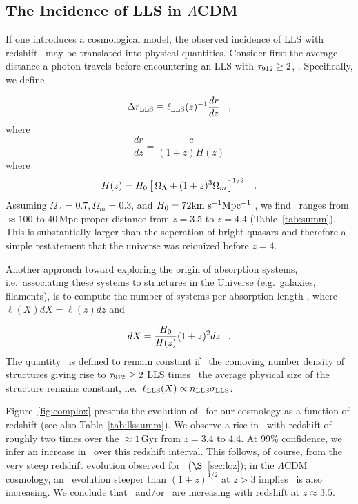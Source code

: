 \documentclass[12pt,preprint]{aastex}
\begin{document}
\subsection{The Incidence of LLS in $\Lambda$CDM}
\label{sec:lox}

If one introduces a cosmological model, the
observed incidence of LLS with redshift \lzlls\ may be translated
into physical
quantities.  Consider first the average distance a photon travels
before encountering an LLS with $\tau_{\rm 912} \ge 2$, \drlls.  
Specifically, we define

\begin{equation}
\Delta r_{\rm LLS} \equiv \ell_{\rm{LLS}}(z)^{-1} \frac{dr}{dz} \;\;\; ,
\end{equation}
where 
\begin{equation}
\frac{dr}{dz}  = \frac{c}{(1+z) H(z)}
\end{equation}
where
\begin{equation}
H(z) = H_0 \left [ \, \Omega_\Lambda + (1+z)^3 \Omega_m \, \right ]^{1/2} \;\;\; .
\end{equation}
Assuming $\Omega_\Lambda = 0.7, \Omega_m = 0.3$, and  $H_0=72 {\rm km~s^{-1}} \rm Mpc^{-1}$
\citep[e.g.][]{wmap05},
we find \drlls\ ranges from $\approx 100$ to 40\,Mpc proper distance
from $z=3.5$ to $z=4.4$ (Table~\ref{tab:summ}).
This is substantially larger than the seperation of bright quasars 
\citep[several Mpc 
for $L_B \ge 10^{40} \rm \, erg \, s^{-1} \, Hz^{-1}$;][]{fg08b} 
and therefore a simple restatement that 
the universe was reionized before $z=4$.


Another approach toward exploring the origin of absorption systems, 
i.e.\ associating
these systems to structures in the Universe (e.g.\ galaxies, filaments),
is to compute
the number of systems per absorption length \llls \citep[][]{bp69},
where $\ell(X) dX = \ell(z) dz$ and 

\begin{equation}
dX = \frac{H_0}{H(z)}(1+z)^2 dz  \;\;\; .
\end{equation}
The quantity \llls\ is defined to remain constant if \nlls\ the
comoving number density
of structures giving rise to $\tau_{\rm 912} \ge 2$ LLS
times \slls\ the average physical size of the structure 
remains constant, i.e.\ $\ell_{\rm{LLS}}(X) \propto n_{\rm LLS} \sigma_{\rm LLS}$.

Figure~\ref{fig:complox} presents the evolution of \llls\
for our cosmology as a function of redshift (see also
Table~\ref{tab:llssumm}).  
We observe a rise in \llls\ with redshift of roughly two times
over the $\approx 1\,$Gyr from $z=3.4$ to 4.4.
At 99\% confidence, we infer an increase in \llls\ over
this redshift interval.
This follows, of course, from the very steep
redshift evolution observed for \lzlls\ ($\S$~\ref{sec:loz});
in the $\Lambda$CDM cosmology, an \lzlls\ evolution steeper
than $(1+z)^{1/2}$ at $z>3$ implies \llls\ is also increasing.
We conclude
that \nlls\ and/or \slls\ are increasing with redshift
at $z \approx 3.5$.  
\end{document}

